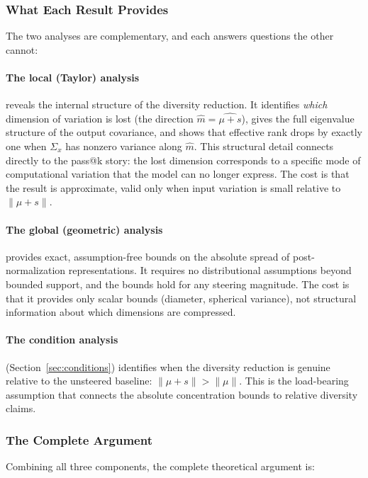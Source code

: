 \subsubsection{What Each Result Provides}

The two analyses are complementary, and each answers questions the other
cannot:

\paragraph{The local (Taylor) analysis} reveals the internal structure
of the diversity reduction.
It identifies \emph{which} dimension of variation is lost (the direction
$\hat{m} = \widehat{\mu + s}$), gives the full eigenvalue structure of
the output covariance, and shows that effective rank drops by exactly one
when $\Sigma_x$ has nonzero variance along $\hat{m}$.
This structural detail connects directly to the pass@k story: the lost
dimension corresponds to a specific mode of computational variation that
the model can no longer express.
The cost is that the result is approximate, valid only when input
variation is small relative to $\|\mu + s\|$.

\paragraph{The global (geometric) analysis} provides exact,
assumption-free bounds on the absolute spread of post-normalization
representations.
It requires no distributional assumptions beyond bounded support, and
the bounds hold for any steering magnitude.
The cost is that it provides only scalar bounds (diameter, spherical
variance), not structural information about which dimensions are
compressed.

\paragraph{The condition analysis} (Section~\ref{sec:conditions})
identifies when the diversity reduction is genuine relative to the
unsteered baseline: $\|\mu + s\| > \|\mu\|$.
This is the load-bearing assumption that connects the absolute
concentration bounds to relative diversity claims.

\subsubsection{The Complete Argument}

Combining all three components, the complete theoretical argument is:


